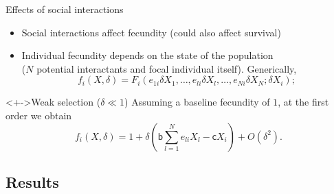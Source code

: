 \documentclass[]{beamer}
\begin{document}
\begin{frame}{Effects of social interactions}
\begin{itemize}[<+->]
\item Social interactions affect \alert{fecundity} (could also affect survival)
\item Individual fecundity depends on the state of the population \\($N$ potential interactants and focal individual itself). \alert{Generically},
\begin{displaymath}
f_i(X,\delta) = F_i \left(e_{1i} \delta X_1, \dots, e_{li} \delta X_l, \dots, e_{Ni} \delta X_N; \delta X_i\right);
\end{displaymath}
\end{itemize}
%
%
\vspace{-2ex}
\begin{block}<+->{Weak selection ($\delta  \ll 1$)}
Assuming a baseline fecundity of $1$, at the first order we obtain
\begin{displaymath}
f_i(X,\delta) = 1 + \delta \left(\mathsf{b} \sum_{l=1}^N e_{li} X_l  - \mathsf{c} X_i \right) + O(\delta^2). 
\end{displaymath}
\vspace{-1em}
\end{block}
\end{frame}



\subsection{Results}
\end{document}
